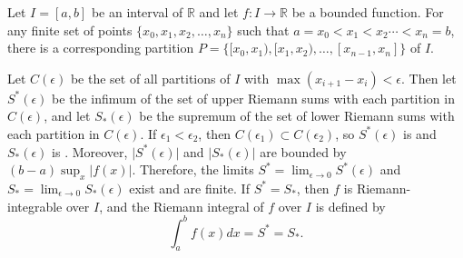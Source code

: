 \documentclass{article}
\begin{document}
Let $I=[a,b]$ be an interval of $\mathbb R$ and let $f\colon I\to \mathbb{R}$ be a bounded function. For any finite set of points $\{x_0, x_1, x_2, \dotsc, x_n\}$ such that $a = x_0 < x_1 < x_2 \dotsb < x_n = b$, there is a corresponding partition $P = \{[x_0, x_1), [x_1, x_2), \dotsc, [x_{n-1}, x_n]\}$ of $I$. 

Let $C(\epsilon)$ be the set of all partitions of $I$ with $\max (x_{i+1}-x_i)<\epsilon$.  Then let $S^{*}(\epsilon)$ be the infimum of the set of upper Riemann sums with each partition in $C(\epsilon)$, and let $S_{*}(\epsilon)$ be the supremum of the set of lower Riemann sums with each partition in $C(\epsilon)$. If $\epsilon_1<\epsilon_2$, then $C(\epsilon_1)\subset C(\epsilon_2)$, so $S^{*}(\epsilon)$ is  and $S_{*}(\epsilon)$ is . Moreover, $\lvert S^{*}(\epsilon)\rvert$ and $\lvert S_{*}(\epsilon)\rvert$ are bounded by $(b-a)\sup_x \lvert f(x)\rvert$. Therefore, the limits $S^{*}=\lim_{\epsilon\to 0} S^{*}(\epsilon)$ and $S_{*}=\lim_{\epsilon\to 0} S_{*}(\epsilon)$ exist and are finite.  If $S^{*} = S_{*}$, then $f$ is Riemann-integrable over $I$, and the Riemann integral of $f$ over $I$ is defined by
\begin{equation*}
\int_{a}^{b} f(x)dx = S^{*} = S_{*}.
\end{equation*}
\end{document}
